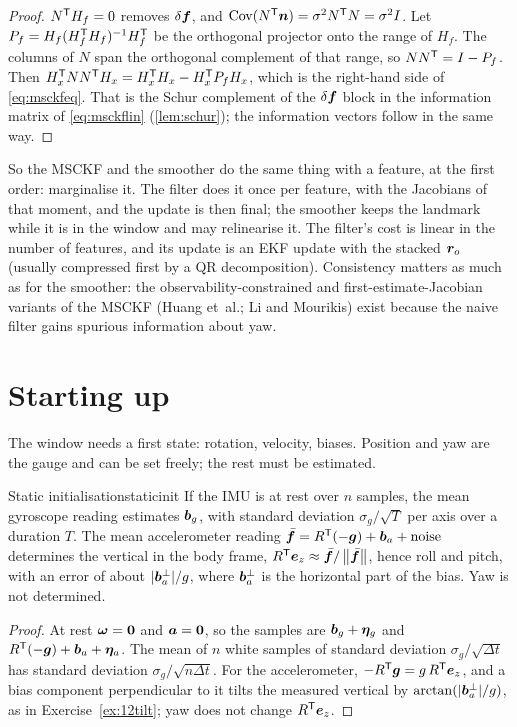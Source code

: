 \begin{proof}
$N^{\mathsf{T}} H_f=0$ removes $\delta\bm{f}$, and $\mathrm{Cov}(N^{\mathsf{T}}\bm{n})=
\sigma^2N^{\mathsf{T}} N=\sigma^2I$. Let $P_f=H_f(H_f^{\mathsf{T}} H_f)^{-1}H_f^{\mathsf{T}}$ be the
orthogonal projector onto the range of $H_f$. The columns of $N$ span
the orthogonal complement of that range, so $NN^{\mathsf{T}}=I-P_f$. Then
$H_x^{\mathsf{T}} NN^{\mathsf{T}} H_x=H_x^{\mathsf{T}} H_x-H_x^{\mathsf{T}} P_fH_x$, which is the right-hand side of
\eqref{eq:msckfeq}. That is the Schur complement of the $\delta
\bm{f}$ block in the information matrix of \eqref{eq:msckflin}
(\cref{lem:schur}); the information vectors follow in the same way.
\end{proof}

So the MSCKF and the smoother do the same thing with a feature, at the
first order: marginalise it. The filter does it once per feature, with
the Jacobians of that moment, and the update is then final; the smoother
keeps the landmark while it is in the window and may relinearise it.
The filter's cost is linear in the number of features, and its update is
an EKF update with the stacked $\bm{r}_o$ (usually compressed first by
a QR decomposition). Consistency matters as much as for the smoother:
the observability-constrained and first-estimate-Jacobian variants of
the MSCKF (Huang et~al.; Li and Mourikis) exist because the naive filter
gains spurious information about yaw.

\section{Starting up}

The window needs a first state: rotation, velocity, biases. Position and
yaw are the gauge and can be set freely; the rest must be estimated.

\begin{proposition}{Static initialisation}{staticinit}
If the IMU is at rest over $n$ samples, the mean gyroscope reading
estimates $\bm{b}_g$, with standard deviation $\sigma_g/\sqrt{T}$ per
axis over a duration $T$. The mean accelerometer reading $\bar{\bm{f}}=
R^{\mathsf{T}}(-\bm{g})+\bm{b}_a+\text{noise}$ determines the vertical in the
body frame, $R^{\mathsf{T}}\bm{e}_z\approx\bar{\bm{f}}/\left\lVert \bar{\bm{f}}\right\rVert$,
hence roll and pitch, with an error of about $|\bm{b}_a^\perp|/g$,
where $\bm{b}_a^\perp$ is the horizontal part of the bias. Yaw is not
determined.
\end{proposition}

\begin{proof}
At rest $\bm{\omega}=\bm{0}$ and $\bm{a}=\bm{0}$, so the samples are
$\bm{b}_g+\bm{\eta}_g$ and $R^{\mathsf{T}}(-\bm{g})+\bm{b}_a+\bm{\eta}_a$. The
mean of $n$ white samples of standard deviation $\sigma_g/\sqrt{\Delta t}$
has standard deviation $\sigma_g/\sqrt{n\Delta t}$. For the
accelerometer, $-R^{\mathsf{T}}\bm{g}=g\,R^{\mathsf{T}}\bm{e}_z$, and a bias component
perpendicular to it tilts the measured vertical by $\arctan(|\bm{b}_a^
\perp|/g)$, as in Exercise~\ref{ex:12tilt}; yaw does not change $R^{\mathsf{T}}
\bm{e}_z$.
\end{proof}

